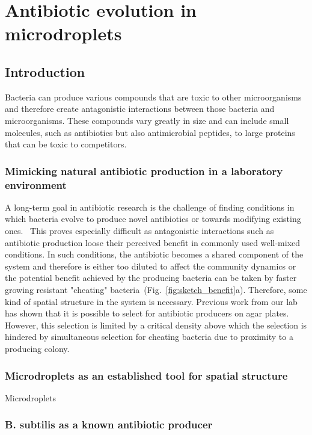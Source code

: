 \part{Antibiotic evolution in microdroplets}
\chapter{Introduction}
\label{chap:droplets_intro}

Bacteria can produce various compounds that are toxic to other microorganisms and therefore create antagonistic interactions between those bacteria and microorganisms. These compounds vary greatly in size and can include small molecules, such as antibiotics but also antimicrobial peptides, to large proteins that can be toxic to competitors.

\section{Mimicking natural antibiotic production in a laboratory environment}
A long-term goal in antibiotic research is the challenge of finding conditions in which bacteria evolve to produce novel antibiotics or towards modifying existing ones.~\cite{Charusanti2012-uy} This proves especially difficult as antagonistic interactions such as antibiotic production loose their perceived benefit in commonly used well-mixed conditions. In such conditions, the antibiotic becomes a shared component of the system and therefore is either too diluted to affect the community dynamics or the potential benefit achieved by the producing bacteria can be taken by faster growing resistant "cheating" bacteria~(Fig.~\ref{fig:sketch_benefit}a). Therefore, some kind of spatial structure in the system is necessary. Previous work from our lab~\cite{Gerardin2016-ac} has shown that it is possible to select for antibiotic producers on agar plates. However, this selection is limited by a critical density above which the selection is hindered by simultaneous selection for cheating bacteria due to proximity to a producing colony.

\section{Microdroplets as an established tool for spatial structure}
Microdroplets 

\section{B. subtilis as a known antibiotic producer}

